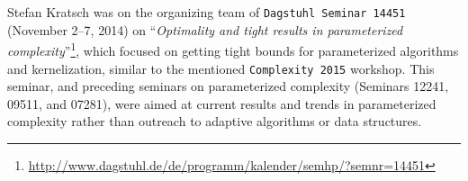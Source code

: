 \documentclass[a4paper,10pt]{article}
\begin{document}
Stefan Kratsch was on the organizing team of \texttt{Dagstuhl Seminar 14451} (November 2--7, 2014) on ``\emph{Optimality and tight results in parameterized complexity}''\footnote{\url{http://www.dagstuhl.de/de/programm/kalender/semhp/?semnr=14451}}, which focused on getting tight bounds for parameterized algorithms and kernelization, similar to the mentioned \texttt{Complexity 2015} workshop. This seminar, and preceding seminars on parameterized complexity (Seminars 12241, 09511, and 07281), were aimed at current results and trends in parameterized complexity rather than outreach to adaptive algorithms or data structures.

\end{document}
